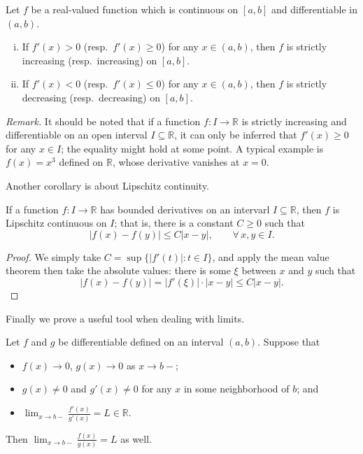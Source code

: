 \begin{cor}
  Let $f$ be a real-valued function which is continuous on $[a,b]$ and differentiable in $(a,b)$.
  \begin{enumerate}[(i)]
    \item If $f'(x) > 0$ (resp.\ $f'(x) \geqslant 0$) for any $x \in (a,b)$, then $f$ is strictly increasing (resp.\ increasing) on $[a,b]$.
    \item If $f'(x) < 0$ (resp.\ $f'(x) \leqslant 0$) for any $x \in (a,b)$, then $f$ is strictly decreasing (resp.\ decreasing) on $[a,b]$.

  \end{enumerate}
\end{cor}

\noindent\textit{Remark.} It should be noted that if a function $f: I \to \mathbb{R}$ is strictly increasing and differentiable on an open interval $I \subseteq \mathbb{R}$, it can only be inferred that $f'(x) \geqslant 0$ for any $x \in I$; the equality might hold at some point.
A typical example is $f(x) = x^3$ defined on $\mathbb{R}$, whose derivative vanishes at $x = 0$.

Another corollary is about Lipschitz continuity.

\begin{cor}
  If a function $f: I \to \mathbb{R}$ has bounded derivatives on an intervarl $I \subseteq \mathbb{R}$, then $f$ is \textsf{Lipschitz continuous} on $I$; that is, there is a constant $C \geqslant 0$ such that
  \[
    |f(x) - f(y)| \leqslant C |x-y|, \qquad \forall\, x, y \in I.
  \]
\end{cor}

\begin{proof}
  We simply take $C = \sup \{ |f'(t)| \colon t \in I \}$, and apply the mean value theorem then take the absolute values: there is some $\xi$ between $x$ and $y$ such that
  \[
    |f(x) - f(y)| = |f'(\xi)| \cdot |x-y| \leqslant C |x-y|.
  \]
\end{proof}

Finally we prove a useful tool when dealing with limits.

\begin{thm}
  Let $f$ and $g$ be differentiable defined on an interval $(a,b)$.
  Suppose that
  \begin{itemize}
    \item $f(x) \to 0$, $g(x) \to 0$ as $x \to b-$;
    \item $g(x) \ne 0$ and $g'(x) \ne 0$ for any $x$ in some neighborhood of $b$; and
    \item $\displaystyle \lim_{x \to b-} \frac{ f'(x) }{ g'(x) } = L \in \mathbb{R}$.
  \end{itemize}
  Then $\displaystyle \lim_{x \to b-} \frac{f(x)}{g(x)} = L$ as well.
\end{thm}

